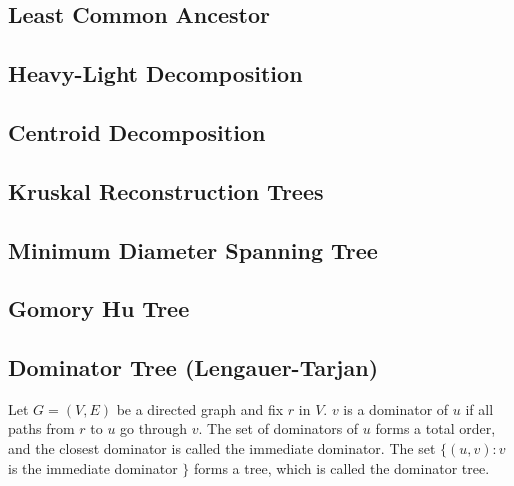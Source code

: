 \subsection{Least Common Ancestor}
\subsection{Heavy-Light Decomposition}
\subsection{Centroid Decomposition}
\subsection{Kruskal Reconstruction Trees}
\subsection{Minimum Diameter Spanning Tree}
\subsection{Gomory Hu Tree}

\newpage

\subsection{Dominator Tree (Lengauer-Tarjan)}

Let $G = (V, E)$ be a directed graph and fix $r$ in $V$.
$v$ is a dominator of $u$ if all paths from $r$ to $u$ go through $v$.
The set of dominators of $u$ forms a total order, and 
the closest dominator is called the immediate dominator.
The set $\{ (u,v) : v$ is the immediate dominator $\}$ forms a tree, 
which is called the dominator tree. \cite{TarjanLengauer1979Jan}


